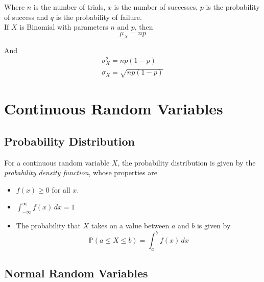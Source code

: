 \documentclass[12pt letter]{report}
\begin{document}
Where $n$ is the number of trials, $x$ is the number of successes, $p$ is the probability of success and $q$ is the
probability of failure. \\

If $X$ is Binomial with parameters $n$ and $p$, then
\[
	\mu_{X} = np
\]

And
\begin{align*}
	\sigma^2_{X} = np \left( 1 - p \right) \\
	\sigma_{X} = \sqrt{np \left( 1 - p \right) }
\end{align*}

\section{Continuous Random Variables}

\subsection{Probability Distribution}

For a continuous random variable $X$, the probability distribution is given by the \textit{probability density
	function}, whose properties are

\begin{itemize}
	\item $f \left( x \right) \geq 0$ for all $x$.
	\item $\int_{-\infty}^{\infty} f \left( x \right) \, dx = 1$
	\item The probability that $X$ takes on a value between $a$ and $b$ is given by
	      \[
		      \mathbb{P} \left( a \leq X \leq b \right) = \int_{a}^{b} f \left( x \right) \, dx
	      \]
\end{itemize}


\subsection{Normal Random Variables}

\end{document}
